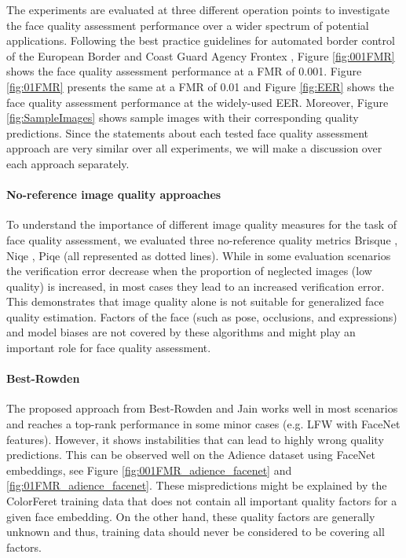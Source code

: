 \documentclass[10pt,twocolumn,letterpaper]{article}
\begin{document}
The experiments are evaluated at three different operation points to investigate the face quality assessment performance over a wider spectrum of potential applications.
Following the best practice guidelines for automated border control of the European Border and Coast Guard Agency Frontex \cite{FrontexBestPractice}, Figure \ref{fig:001FMR} shows the face quality assessment performance at a FMR of 0.001.
Figure \ref{fig:01FMR} presents the same at a FMR of 0.01 and Figure \ref{fig:EER} shows the face quality assessment performance at the widely-used EER.
Moreover, Figure \ref{fig:SampleImages} shows sample images with their corresponding quality predictions.
Since the statements about each tested face quality assessment approach are very similar over all experiments, we will make a discussion over each approach separately.

\vspace{-0mm}

\paragraph{No-reference image quality approaches}
To understand the importance of different image quality measures for the task of face quality assessment, we evaluated three no-reference quality metrics  Brisque \cite{6272356}, Niqe \cite{6353522}, Piqe \cite{7084843} (all represented as dotted lines).
While in some evaluation scenarios the verification error decrease when the proportion of neglected images (low quality) is increased, in most cases they lead to an increased verification error.
This demonstrates that image quality alone is not suitable for generalized face quality estimation.
Factors of the face (such as pose, occlusions, and expressions) and model biases are not covered by these algorithms and might play an important role for face quality assessment.

\vspace{-2mm}
\paragraph{Best-Rowden}
The proposed approach from Best-Rowden and Jain \cite{DBLP:journals/corr/Best-RowdenJ17} works well in most scenarios and reaches a top-rank performance in some minor cases (e.g. LFW with FaceNet features).
However, it shows instabilities that can lead to highly wrong quality predictions.
This can be observed well on the Adience dataset using FaceNet embeddings, see Figure \ref{fig:001FMR_adience_facenet} and \ref{fig:01FMR_adience_facenet}.
These mispredictions might be explained by the ColorFeret training data that does not contain all important quality factors for a given face embedding.
On the other hand, these quality factors are generally unknown and thus, training data should never be considered to be covering all factors.
\end{document}
